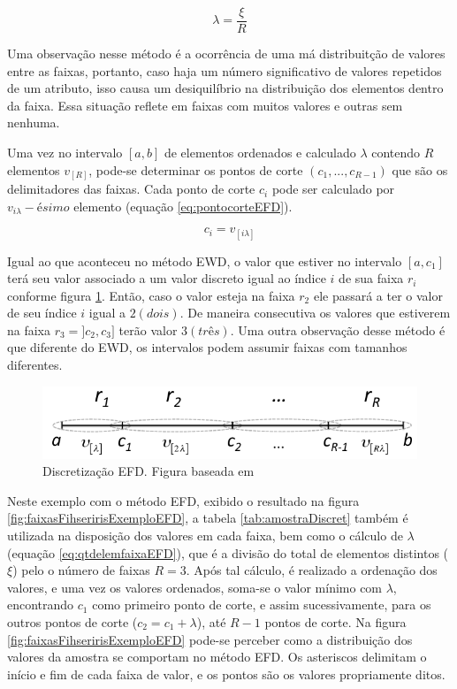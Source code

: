 \begin{equation}
\lambda = \frac{\xi}{R}
 \label{eq:qtdelemfaixaEFD}
\end{equation}

Uma observação nesse método é a ocorrência de uma má distribuitção de valores entre as faixas, portanto, caso haja um número significativo de valores repetidos de um atributo, isso causa um desiquilíbrio na distribuição dos elementos dentro da faixa. Essa situação reflete em faixas com muitos valores e outras sem nenhuma. 

Uma vez no intervalo ${[a,b]}$ de elementos ordenados e calculado ${\lambda}$ contendo ${R}$ elementos ${v_{[R]}}$,  pode-se determinar os pontos de corte ${(c_1,...,c_{R-1})}$ que são os delimitadores das faixas. Cada ponto de corte ${c_i}$ pode ser calculado por ${v_{i\lambda}-ésimo}$ elemento (equação \ref{eq:pontocorteEFD}).

\begin{equation}
c_i = v_{[i\lambda]}
 \label{eq:pontocorteEFD}
\end{equation}

Igual ao que aconteceu no método EWD, o valor que estiver no intervalo ${[a,c_1]}$ terá seu valor associado a um valor discreto igual ao índice ${i}$ de sua faixa ${r_i}$ conforme figura \ref{fig:faixasEFD}. Então, caso o valor esteja na faixa ${r_2}$ ele passará a ter o valor de seu índice ${i}$ igual a ${2(dois)}$. De maneira consecutiva os valores que estiverem na faixa ${r_3=]c_2,c_3]}$ terão valor ${3(três)}$. Uma outra observação desse método é que diferente do EWD, os intervalos podem assumir faixas com tamanhos diferentes.

\begin{figure}[h]
        \centering
        \includegraphics[scale=0.6]{figs/discretizacaoEFD.png}
        \caption[Discretização EFD]{Discretização EFD. Figura baseada em \cite{Lopes2016}} 
        \label{fig:faixasEFD}
\end{figure} 

Neste exemplo com o método EFD, exibido o resultado na figura \ref{fig:faixasFihseririsExemploEFD}, a tabela \ref{tab:amostraDiscret} também é utilizada na disposição dos valores em cada faixa, bem como o cálculo de ${\lambda}$ (equação \ref{eq:qtdelemfaixaEFD}), que é a divisão do total  de elementos distintos (${\xi}$) pelo o número de faixas ${R=3}$. Após tal cálculo, é realizado a ordenação dos valores, e uma  vez os valores ordenados, soma-se o valor mínimo com ${\lambda}$, encontrando ${c_1}$  como primeiro ponto de corte, e assim sucessivamente, para os outros pontos de corte (${c_2=c_1+\lambda}$), até ${R-1}$ pontos de corte. Na figura \ref{fig:faixasFihseririsExemploEFD} pode-se perceber como a distribuição  dos valores da amostra se comportam no método EFD. Os asteriscos delimitam o início e fim de cada faixa de valor, e os pontos são os valores propriamente ditos.

